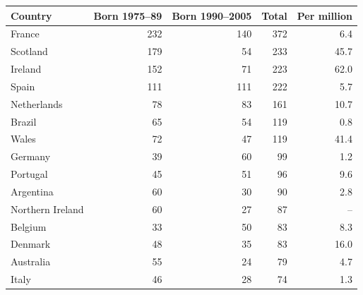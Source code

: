 \begin{tabular}{lrrrr}
\toprule
Country & Born 1975--89 & Born 1990--2005 & Total & Per million
\\
\midrule
France & 232 & 140 & 372 & 6.4 \\
Scotland & 179 & 54 & 233 & 45.7 \\
Ireland & 152 & 71 & 223 & 62.0 \\
Spain & 111 & 111 & 222 & 5.7 \\
Netherlands & 78 & 83 & 161 & 10.7 \\
Brazil & 65 & 54 & 119 & 0.8 \\
Wales & 72 & 47 & 119 & 41.4 \\
Germany & 39 & 60 & 99 & 1.2 \\
Portugal & 45 & 51 & 96 & 9.6 \\
Argentina & 60 & 30 & 90 & 2.8 \\
Northern Ireland & 60 & 27 & 87 & -- \\
Belgium & 33 & 50 & 83 & 8.3 \\
Denmark & 48 & 35 & 83 & 16.0 \\
Australia & 55 & 24 & 79 & 4.7 \\
Italy & 46 & 28 & 74 & 1.3 \\
\bottomrule
\end{tabular}
